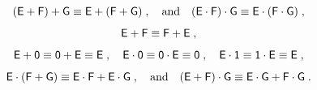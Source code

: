 \begin{lemma}\label{lm:expression_identities}
    \begin{gather*}
        ({\mathsf{E}} + {\mathsf{F}}) + {\mathsf{G}} \equiv {\mathsf{E}} + ({\mathsf{F}} + {\mathsf{G}}) \; , \quad \text{and} \quad ({\mathsf{E}} \cdot {\mathsf{F}}) \cdot {\mathsf{G}} \equiv {\mathsf{E}} \cdot ({\mathsf{F}} \cdot {\mathsf{G}}) \; ,\\[1ex]
        {\mathsf{E}} + {\mathsf{F}} \equiv {\mathsf{F}} + {\mathsf{E}} \; ,\\[1ex]
        {\mathsf{E}} + {\mathsf{0}} \equiv {\mathsf{0}} + {\mathsf{E}} \equiv {\mathsf{E}} \; , \quad {\mathsf{E}} \cdot {\mathsf{0}} \equiv {\mathsf{0}} \cdot {\mathsf{E}} \equiv {\mathsf{0}} \; , \quad {\mathsf{E}} \cdot {\mathsf{1}} \equiv {\mathsf{1}} \cdot {\mathsf{E}} \equiv {\mathsf{E}} \; ,\\[1ex]
        {\mathsf{E}} \cdot ({\mathsf{F}} + {\mathsf{G}}) \equiv {\mathsf{E}} \cdot {\mathsf{F}} + {\mathsf{E}} \cdot {\mathsf{G}} \; , \quad \text{and} \quad ({\mathsf{E}} + {\mathsf{F}}) \cdot {\mathsf{G}} \equiv {\mathsf{E}} \cdot {\mathsf{G}} + {\mathsf{F}} \cdot {\mathsf{G}} \; .
    \end{gather*}
\end{lemma}

